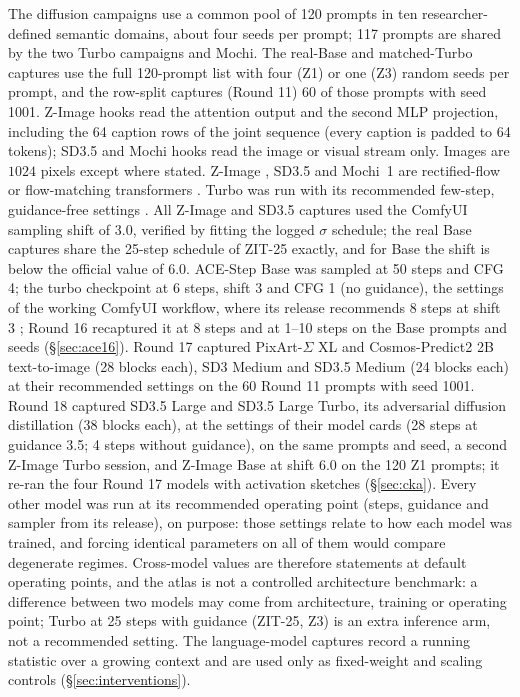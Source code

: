 \documentclass[11pt]{article}
\newcommand{\TT}{ZIT-25}%
\begin{document}
The diffusion campaigns use a common pool of 120 prompts in ten researcher-defined semantic domains, about four seeds per prompt; 117 prompts are shared by the two Turbo campaigns and Mochi. The real-Base and matched-Turbo captures use the full 120-prompt list with four (Z1) or one (Z3) random seeds per prompt, and the row-split captures (Round 11) 60 of those prompts with seed 1001. Z-Image hooks read the attention output and the second MLP projection, including the 64 caption rows of the joint sequence (every caption is padded to 64 tokens); SD3.5 and Mochi hooks read the image or visual stream only. Images are $1024$ pixels except where stated. Z-Image \citep{zimageteam2025zimage}, SD3.5 \citep{esser2024scaling} and Mochi~1 \citep{genmo2024mochi} are rectified-flow or flow-matching transformers \citep{liu2023flow,lipman2023flow,peebles2023scalable}. Turbo was run with its recommended few-step, guidance-free settings \citep{tongyi2025zimageturbo}. All Z-Image and SD3.5 captures used the ComfyUI \citep{comfyui2023} sampling shift of $3.0$, verified by fitting the logged $\sigma$ schedule; the real Base captures share the 25-step schedule of \TT{} exactly, and for Base the shift is below the official value of $6.0$. ACE-Step Base was sampled at 50 steps and CFG 4; the turbo checkpoint at 6 steps, shift 3 and CFG 1 (no guidance), the settings of the working ComfyUI workflow, where its release recommends 8 steps at shift 3 \citep{gong2026acestep15}; Round 16 recaptured it at 8 steps and at 1--10 steps on the Base prompts and seeds (\S\ref{sec:ace16}). Round 17 captured PixArt-$\Sigma$ XL \citep{chen2024pixartsigma} and Cosmos-Predict2 2B text-to-image \citep{nvidia2025cosmos} (28 blocks each), SD3 Medium and SD3.5 Medium \citep{esser2024scaling} (24 blocks each) at their recommended settings on the 60 Round 11 prompts with seed 1001. Round 18 captured SD3.5 Large and SD3.5 Large Turbo, its adversarial diffusion distillation \citep{sauer2024adversarial} (38 blocks each), at the settings of their model cards (28 steps at guidance 3.5; 4 steps without guidance), on the same prompts and seed, a second Z-Image Turbo session, and Z-Image Base at shift $6.0$ on the 120 Z1 prompts; it re-ran the four Round 17 models with activation sketches (\S\ref{sec:cka}). Every other model was run at its recommended operating point (steps, guidance and sampler from its release), on purpose: those settings relate to how each model was trained, and forcing identical parameters on all of them would compare degenerate regimes. Cross-model values are therefore statements at default operating points, and the atlas is not a controlled architecture benchmark: a difference between two models may come from architecture, training or operating point; Turbo at 25 steps with guidance (\TT{}, Z3) is an extra inference arm, not a recommended setting. The language-model captures \citep{qwen2024qwen25,jiang2023mistral,grattafiori2024llama} record a running statistic over a growing context and are used only as fixed-weight and scaling controls (\S\ref{sec:interventions}).
\end{document}
